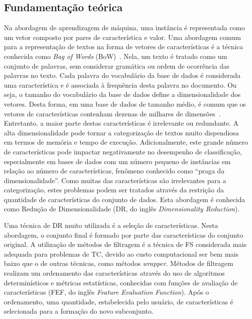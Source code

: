 \documentclass[conference]{IEEEtran}
\begin{document}
\subsection{Fundamentação teórica}

Na abordagem de aprendizagem de máquina, uma instância é representada como um vetor composto por pares de característica e valor.
Uma abordagem comum para a representação de textos na forma de vetores de características é a técnica conhecida como \emph{Bag of Words} (BoW)~\cite{guyon2003introduction}. Nela, um texto é tratado como um conjunto de palavras, sem considerar gramática ou ordem de ocorrência das palavras no texto.
Cada palavra do vocabulário da base de dados é considerada uma característica e é associada à frequência desta palavra no documento. Ou seja, o tamanho do vocabulário da base de dados define a dimensionalidade dos vetores.
Desta forma, em uma base de dados de tamanho médio, é comum que os vetores de características contenham dezenas de milhares de dimensões~\cite{gabrilovich2004text}. Entretanto, a maior parte destas características é irrelevante ou redundante. A alta dimensionalidade pode tornar a categorização de textos muito dispendiosa em termos de memória e tempo de execução.
Adicionalmente, este grande número de características pode impactar negativamente no desempenho de classificação, especialmente em bases de dados com um número pequeno de instâncias em relação ao número de características, fenômeno conhecido como ``praga da dimensionalidade''.
Como muitas das características são irrelevantes para a categorização, estes problemas podem ser tratados através da restrição da quantidade de características do conjunto de dados. Esta abordagem é conhecida como Redução de Dimensionalidade (DR, do inglês \emph{Dimensionality Reduction}).

Uma técnica de DR muito utilizada é a seleção de características. Nesta abordagem, o conjunto final é formado por parte das características do conjunto original. A utilização de métodos de filtragem é a técnica de FS considerada mais adequada para problemas de TC, devido ao custo computacional ser bem mais baixo que o de outras técnicas, como métodos \emph{wrapper}. Métodos de filtragem realizam um ordenamento das características através do uso de algoritmos determinísticos e métricas estatísticas, conhecidas com funções de avaliação de características (FEF, do inglês \emph{Feature Evaluation Function}). Após o ordenamento, uma quantidade, estabelecida pelo usuário, de características é selecionada para a formação do novo subconjunto.
\end{document}
